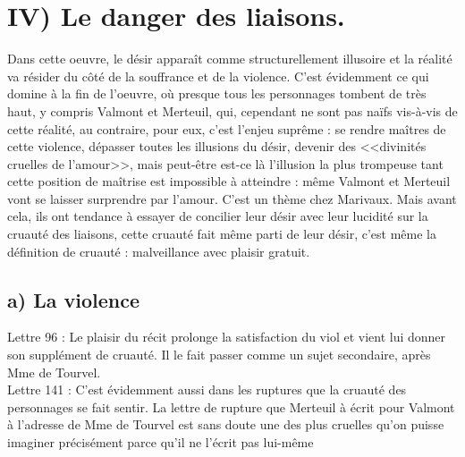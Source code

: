 \documentclass[12pt]{article}
\begin{document}
\section*{IV) Le danger des liaisons.}
Dans cette oeuvre, le désir apparaît comme structurellement illusoire et la réalité va résider du côté de la souffrance et de la violence. C'est évidemment ce qui domine à la fin de l'oeuvre, où presque tous les personnages tombent de très haut, y compris Valmont et Merteuil, qui, cependant ne sont pas naïfs vis-à-vis de cette réalité, au contraire, pour eux, c'est l'enjeu suprême : se rendre maîtres de cette violence, dépasser toutes les illusions du désir, devenir des <<divinités cruelles de l'amour>>, mais peut-être est-ce là l'illusion la plus trompeuse tant cette position de maîtrise est impossible à atteindre : même Valmont et Merteuil vont se laisser surprendre par l'amour. C'est un thème chez Marivaux.
Mais avant cela, ils ont tendance à essayer de concilier leur désir avec leur lucidité sur la cruauté des liaisons, cette cruauté fait même parti de leur désir, c'est même la définition de cruauté : malveillance avec plaisir gratuit.
\subsection*{a) La violence}
Lettre 96 : Le plaisir du récit prolonge la satisfaction du viol et vient lui donner son supplément de cruauté.
Il le fait passer comme un sujet secondaire, après Mme de Tourvel. \\
Lettre 141 : C'est évidemment aussi dans les ruptures que la cruauté des personnages se fait sentir. La lettre de rupture que Merteuil à écrit pour Valmont à l'adresse de Mme de Tourvel est sans doute une des plus cruelles qu'on puisse imaginer précisément parce qu'il ne l'écrit pas lui-même
\end{document}
